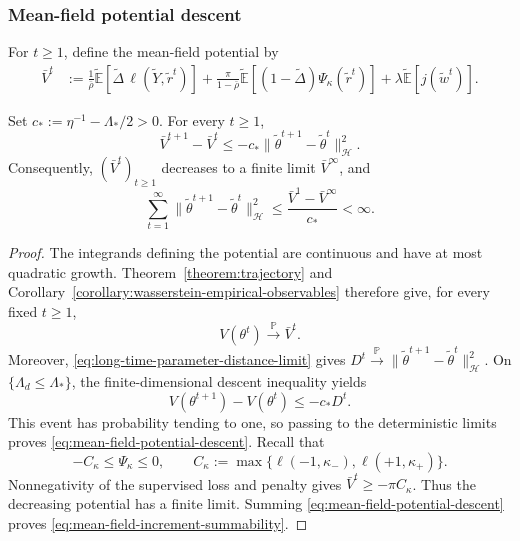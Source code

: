 \subsubsection{Mean-field potential descent}
\label{subsubsec:mean-field-potential-descent}

For $t\geq1$, define the mean-field potential by
\begin{align}
    \bar V^t
    &:=
    \frac1{\bar\rho}
        \tilde{\mathbb E}
        [\tilde\Delta\,\ell(\tilde Y,\tilde r^t)]
    +
    \frac{\pi}{1-\bar\rho}
        \tilde{\mathbb E}
        [(1-\tilde\Delta)\Psi_\kappa(\tilde r^t)]
    +
    \lambda\tilde{\mathbb E}[j(\tilde w^t)].
    \label{eq:mean-field-potential}
\end{align}

\begin{proposition}
\label{prop:mean-field-potential-descent}
Set $c_*:=\eta^{-1}-\Lambda_*/2>0$. For every $t\geq1$,
\begin{equation}
    \bar V^{t+1}-\bar V^t
    \leq-c_*\|\tilde\theta^{t+1}-\tilde\theta^t\|_{\mathcal H}^2.
    \label{eq:mean-field-potential-descent}
\end{equation}
Consequently, $(\bar V^t)_{t\geq1}$ decreases to a finite limit
$\bar V^\infty$, and
\begin{equation}
    \sum_{t=1}^{\infty}
        \|\tilde\theta^{t+1}-\tilde\theta^t\|_{\mathcal H}^2
    \leq\frac{\bar V^1-\bar V^\infty}{c_*}<\infty.
    \label{eq:mean-field-increment-summability}
\end{equation}
\end{proposition}

\begin{proof}
The integrands defining the potential are continuous and have
at most quadratic growth. Theorem~\ref{theorem:trajectory} and
Corollary~\ref{corollary:wasserstein-empirical-observables}
therefore give, for every fixed $t\geq1$,
\[
    V(\theta^t)\xrightarrow{\mathbb P}\bar V^t.
\]
Moreover, \eqref{eq:long-time-parameter-distance-limit} gives $D^t\xrightarrow{\mathbb P}
    \|\tilde\theta^{t+1}-\tilde\theta^t\|_{\mathcal H}^2$. 
On $\{\Lambda_d\leq\Lambda_*\}$, the finite-dimensional
descent inequality yields
\[
    V(\theta^{t+1})-V(\theta^t)\leq-c_*D^t.
\]
This event has probability tending to one, so passing to the
deterministic limits proves
\eqref{eq:mean-field-potential-descent}.
Recall that
\[
    -C_\kappa\leq\Psi_\kappa\leq0,
    \qquad
    C_\kappa:=
    \max\{\ell(-1,\kappa_-),\ell(+1,\kappa_+)\}.
\]
Nonnegativity of the supervised loss and penalty gives
$\bar V^t\geq-\pi C_\kappa$.
Thus the decreasing potential has a finite limit.
Summing \eqref{eq:mean-field-potential-descent} proves
\eqref{eq:mean-field-increment-summability}.
\end{proof}

